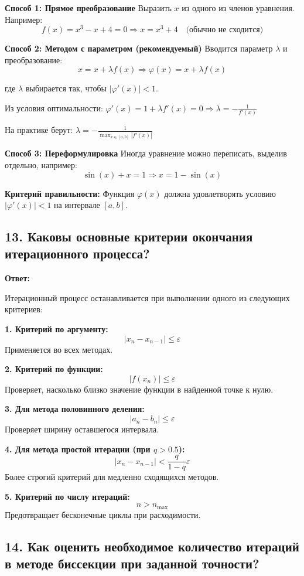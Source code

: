 \documentclass[a4paper,12pt]{article}
\begin{document}
\textbf{Способ 1: Прямое преобразование}
Выразить $x$ из одного из членов уравнения. Например:
\[
    f(x) = x^3 - x + 4 = 0 \Rightarrow x = x^3 + 4 \quad \text{(обычно не сходится)}
\]

\textbf{Способ 2: Методом с параметром (рекомендуемый)}
Вводится параметр $\lambda$ и преобразование:
\[
    x = x + \lambda f(x) \Rightarrow \varphi(x) = x + \lambda f(x)
\]

где $\lambda$ выбирается так, чтобы $|\varphi'(x)| < 1$.

Из условия оптимальности: $\varphi'(x) = 1 + \lambda f'(x) = 0 \Rightarrow \lambda = -\frac{1}{f'(x)}$

На практике берут: $\lambda = -\frac{1}{\max_{x \in [a,b]} |f'(x)|}$

\textbf{Способ 3: Переформулировка}
Иногда уравнение можно переписать, выделив отдельно, например:
\[
    \sin(x) + x = 1 \Rightarrow x = 1 - \sin(x)
\]

\textbf{Критерий правильности:} Функция $\varphi(x)$ должна удовлетворять условию $|\varphi'(x)| < 1$ на интервале $[a, b]$.

\subsection*{13. Каковы основные критерии окончания итерационного процесса?}

\textbf{Ответ:} 

Итерационный процесс останавливается при выполнении одного из следующих критериев:

\textbf{1. Критерий по аргументу:}
\[
    |x_n - x_{n-1}| \leq \varepsilon
\]
Применяется во всех методах.

\textbf{2. Критерий по функции:}
\[
    |f(x_n)| \leq \varepsilon
\]
Проверяет, насколько близко значение функции в найденной точке к нулю.

\textbf{3. Для метода половинного деления:}
\[
    |a_n - b_n| \leq \varepsilon
\]
Проверяет ширину оставшегося интервала.

\textbf{4. Для метода простой итерации (при $q > 0.5$):}
\[
    |x_n - x_{n-1}| < \frac{q}{1-q} \varepsilon
\]
Более строгий критерий для медленно сходящихся методов.

\textbf{5. Критерий по числу итераций:}
\[
    n > n_{\max}
\]
Предотвращает бесконечные циклы при расходимости.

\subsection*{14. Как оценить необходимое количество итераций в методе биссекции при заданной точности?}
\end{document}
